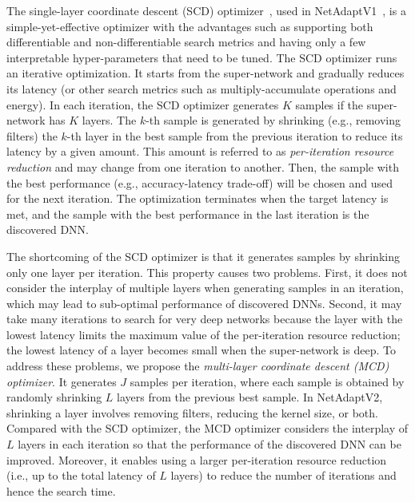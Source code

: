 The single-layer coordinate descent (SCD) optimizer~\cite{book2020sze}, used in NetAdaptV1~\cite{eccv2018-netadapt}, is a simple-yet-effective optimizer with the advantages such as supporting both differentiable and non-differentiable search metrics and having only a few interpretable hyper-parameters that need to be tuned. The SCD optimizer runs an iterative optimization. It starts from the super-network and gradually reduces its latency (or other search metrics such as multiply-accumulate operations and energy). In each iteration, the SCD optimizer generates $K$ samples if the super-network has $K$ layers. The $k$-th sample is generated by shrinking (e.g., removing filters) the $k$-th layer in the best sample from the previous iteration to reduce its latency by a given amount. This amount is referred to as \emph{per-iteration resource reduction} and may change from one iteration to another. Then, the sample with the best performance (e.g., accuracy-latency trade-off) will be chosen and used for the next iteration. The optimization terminates when the target latency is met, and the sample with the best performance in the last iteration is the discovered DNN.

The shortcoming of the SCD optimizer is that it generates samples by shrinking only one layer per iteration. This property causes two problems. First, it does not consider the interplay of multiple layers when generating samples in an iteration, which may lead to sub-optimal performance of discovered DNNs. Second, it may take many iterations to search for very deep networks because the layer with the lowest latency limits the maximum value of the per-iteration resource reduction; the lowest latency of a layer becomes small when the super-network is deep. To address these problems, we propose the \emph{multi-layer coordinate descent (MCD) optimizer}. It generates $J$ samples per iteration, where each sample is obtained by randomly shrinking $L$ layers from the previous best sample. In NetAdaptV2, shrinking a layer involves removing filters, reducing the kernel size, or both. Compared with the SCD optimizer, the MCD optimizer considers the interplay of $L$ layers in each iteration so that the performance of the discovered DNN can be improved. Moreover, it enables using a larger per-iteration resource reduction (i.e., up to the total latency of $L$ layers) to reduce the number of iterations and hence the search time.